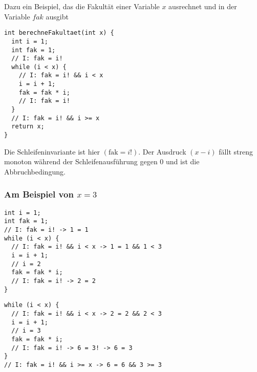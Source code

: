 \documentclass{lehramt-informatik-haupt}
\begin{document}
Dazu ein Beispiel, das die Fakultät einer Variable $x$ ausrechnet und in
der Variable $fak$ ausgibt

\begin{verbatim}
int berechneFakultaet(int x) {
  int i = 1;
  int fak = 1;
  // I: fak = i!
  while (i < x) {
    // I: fak = i! && i < x
    i = i + 1;
    fak = fak * i;
    // I: fak = i!
  }
  // I: fak = i! && i >= x
  return x;
}
\end{verbatim}

\noindent
Die Schleifeninvariante ist hier $(\text{fak} = i!)$. Der Ausdruck $(x -
i)$ fällt streng monoton während der Schleifenausführung gegen $0$ und
ist die Abbruchbedingung.

\subsubsection{Am Beispiel von $x = 3$}

\begin{multicols}{2}

\begin{verbatim}
int i = 1;
int fak = 1;
// I: fak = i! -> 1 = 1
while (i < x) {
  // I: fak = i! && i < x -> 1 = 1 && 1 < 3
  i = i + 1;
  // i = 2
  fak = fak * i;
  // I: fak = i! -> 2 = 2
}
\end{verbatim}


\begin{verbatim}
while (i < x) {
  // I: fak = i! && i < x -> 2 = 2 && 2 < 3
  i = i + 1;
  // i = 3
  fak = fak * i;
  // I: fak = i! -> 6 = 3! -> 6 = 3
}
// I: fak = i! && i >= x -> 6 = 6 && 3 >= 3
\end{verbatim}

\end{multicols}

\literatur
\end{document}
